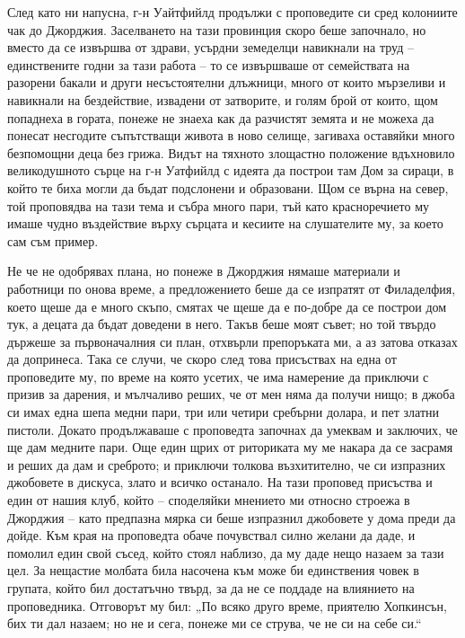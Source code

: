 \documentclass[12pt]{book}
\begin{document}
След като ни напусна, г-н Уайтфийлд продължи с проповедите си сред колониите чак до Джорджия. Заселването на тази провинция скоро беше започнало, но вместо да се извършва от здрави, усърдни земеделци навикнали на труд – единствените годни за тази работа – то се извършваше от семействата на разорени бакали и други несъстоятелни длъжници, много от които мързеливи и навикнали на бездействие, извадени от затворите, и голям брой от които, щом попаднеха в гората, понеже не знаеха как да разчистят земята и не можеха да понесат несгодите съпътстващи живота в ново селище, загиваха оставяйки много безпомощни деца без грижа. Видът на тяхното злощастно положение вдъхновило великодушното сърце на г-н Уатфийлд с идеята да построи там Дом за сираци, в който те биха могли да бъдат подслонени и образовани. Щом се върна на север, той проповядва на тази тема и събра много пари, тъй като красноречието му имаше чудно въздействие върху сърцата и кесиите на слушателите му, за което сам съм пример. 

Не че не одобрявах плана, но понеже в Джорджия нямаше материали и работници по онова време, а предложението беше да се изпратят от Филаделфия, което щеше да е много скъпо, смятах че щеше да е по-добре да се построи дом тук, а децата да бъдат доведени в него. Такъв беше моят съвет; но той твърдо държеше за първоначалния си план, отхвърли препоръката ми, а аз затова отказах да допринеса. Така се случи, че скоро след това присъствах на една от проповедите му, по време на която усетих, че има намерение да приключи с призив за дарения, и мълчаливо реших, че от мен няма да получи нищо; в джоба си имах една шепа медни пари, три или четири сребърни долара, и пет златни пистоли. Докато продължаваше с проповедта започнах да умеквам и заключих, че ще дам медните пари. Още един щрих от риториката му ме накара да се засрамя и реших да дам и среброто; и приключи толкова възхитително, че си изпразних джобовете в дискуса, злато и всичко останало. На тази проповед присъства и един от нашия клуб, който – споделяйки мнението ми относно строежа в Джорджия – като предпазна мярка си беше изпразнил джобовете у дома преди да дойде. Към края на проповедта обаче почувствал силно желани да даде, и помолил един свой съсед, който стоял наблизо, да му даде нещо назаем за тази цел. За нещастие молбата била насочена към може би единствения човек в групата, който бил достатъчно твърд, за да не се поддаде на влиянието на проповедника. Отговорът му бил: „По всяко друго време, приятелю Хопкинсън, бих ти дал назаем; но не и сега, понеже ми се струва, че не си на себе си.“
\end{document}
